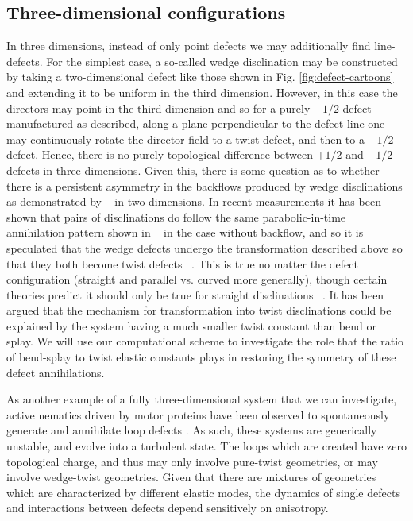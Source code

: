 \documentclass[reqno]{article}
\begin{document}
  \subsection{Three-dimensional configurations}
  In three dimensions, instead of only point defects we may additionally
  find line-defects.
  For the simplest case, a so-called wedge disclination may be constructed by
  taking a two-dimensional
  defect like those shown in Fig. \ref{fig:defect-cartoons} and extending it to be uniform in the third
  dimension.
  However, in this case the directors may point in the third dimension and so
  for a purely $+1/2$ defect manufactured as described, along a plane
  perpendicular to the defect line one may continuously rotate the director
  field to a twist defect, and then to a $-1/2$ defect.
  Hence, there is no purely topological difference between $+1/2$ and $-1/2$
  defects in three dimensions.
  Given this, there is some question as to whether there is a persistent
  asymmetry in the backflows produced by wedge disclinations as demonstrated by
  ~\cite{svensek_hydrodynamics_2002} in two dimensions.
  In recent measurements it has been shown that pairs of disclinations do follow
  the same parabolic-in-time annihilation pattern shown in ~\cite{svensek_hydrodynamics_2002} in
  the case without backflow, and so it is speculated that the wedge defects
  undergo the transformation described above so that they both become twist
  defects ~\cite{zushi_scaling_2021}.
  This is true no matter the defect configuration (straight and parallel vs.
  curved more generally), though certain theories predict it should only be true
  for straight disclinations ~\cite{D0SM01899F}.
  It has been argued that the mechanism for transformation into twist
  disclinations could be explained by the system having a much smaller twist
  constant than bend or splay.
  We will use our computational scheme to investigate the role that the ratio of
  bend-splay to twist elastic constants plays in restoring the symmetry of these
  defect annihilations.

  As another example of a fully three-dimensional system that we can
  investigate, active nematics driven by motor proteins have been observed to
  spontaneously generate and annihilate loop defects
  \cite{doi:10.1126/science.aaz4547, PhysRevLett.124.088001}.
  As such, these systems are generically unstable, and evolve into a turbulent
  state.
  The loops which are created have zero topological charge, and thus may only
  involve pure-twist geometries, or may involve wedge-twist geometries.
  Given that there are mixtures of geometries which are characterized by
  different elastic modes, the dynamics of single defects and interactions
  between defects depend sensitively on anisotropy.
\end{document}
